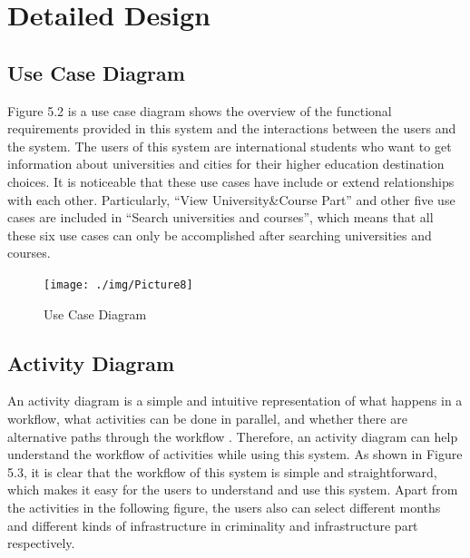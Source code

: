 \section{Detailed Design}
\subsection{Use Case Diagram}
Figure 5.2 is a use case diagram shows the overview of the functional requirements provided in this system and the interactions between the users and the system. The users of this system are international students who want to get information about universities and cities for their higher education destination choices. It is noticeable that these use cases have include or extend relationships with each other. Particularly, “View University\&Course Part” and other five use cases are included in “Search universities and courses”, which means that all these six use cases can only be accomplished after searching universities and courses.

\begin{figure}[H]
  \centering
  \texttt{[image: ./img/Picture8]}
  \caption{Use Case Diagram}
  \label{Figure:figex}
\end{figure}

\subsection{Activity Diagram}
An activity diagram is a simple and intuitive representation of what happens in a workflow, what activities can be done in parallel, and whether there are alternative paths through the workflow \cite{IBM}. Therefore, an activity diagram can help understand the workflow of activities while using this system. As shown in Figure 5.3, it is clear that the workflow of this system is simple and straightforward, which makes it easy for the users to understand and use this system. Apart from the activities in the following figure, the users also can select different months and different kinds of infrastructure in criminality and infrastructure part respectively. 
 


